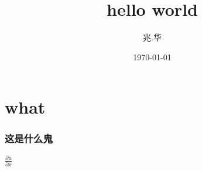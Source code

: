 \documentclass[UTF8]{ctexart}
\title{hello world}
\author{兆.华}
\date{\today}
\begin{document}
\maketitle
\part{what}
\section{这是什么鬼}
$\frac{\partial u}{\partial x}$
\end{document}
